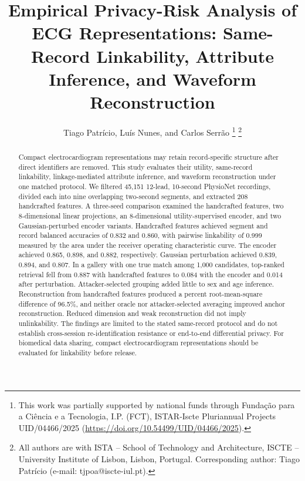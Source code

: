 \documentclass[journal]{IEEEtran}
\begin{document}
\title{Empirical Privacy-Risk Analysis of ECG Representations:
Same-Record Linkability, Attribute Inference, and Waveform Reconstruction}

\author{Tiago Patrício, Luís Nunes, and Carlos Serrão%
\thanks{This work was partially supported by national funds through
Funda\c{c}\~ao para a Ci\^encia e a Tecnologia, I.P. (FCT), ISTAR-Iscte
Pluriannual Projects UID/04466/2025
(\protect\url{https://doi.org/10.54499/UID/04466/2025}).}%
\thanks{All authors are with ISTA -- School of Technology and Architecture,
ISCTE -- University Institute of Lisbon, Lisbon, Portugal.
Corresponding author: Tiago Patrício (e-mail: tjpoa@iscte-iul.pt).}}

\maketitle

\begin{abstract}
Compact electrocardiogram representations may retain record-specific structure
after direct identifiers are removed. This study evaluates their utility,
same-record linkability, linkage-mediated attribute inference, and waveform
reconstruction under one matched protocol. We filtered 45,151 12-lead,
10-second PhysioNet recordings, divided each into nine overlapping two-second
segments, and extracted 208 handcrafted features. A three-seed comparison
examined the handcrafted features, two 8-dimensional linear projections, an
8-dimensional utility-supervised encoder, and two Gaussian-perturbed encoder
variants. Handcrafted features achieved segment and record balanced accuracies
of 0.832 and 0.860, with pairwise linkability of 0.999 measured by the area
under the receiver operating characteristic curve. The encoder achieved 0.865,
0.898, and 0.882, respectively. Gaussian perturbation achieved 0.839, 0.894,
and 0.807. In a gallery with one true match among 1,000 candidates, top-ranked
retrieval fell from 0.887 with handcrafted features to 0.084 with the encoder
and 0.014 after perturbation. Attacker-selected grouping added little to sex
and age inference. Reconstruction from handcrafted features produced a percent
root-mean-square difference of 96.5\%, and neither oracle nor attacker-selected
averaging improved anchor reconstruction. Reduced dimension and weak
reconstruction did not imply unlinkability. The findings are limited to the
stated same-record protocol and do not establish cross-session re-identification
resistance or end-to-end differential privacy. For biomedical data sharing,
compact electrocardiogram representations should be evaluated for linkability
before release.
\end{abstract}
\end{document}
